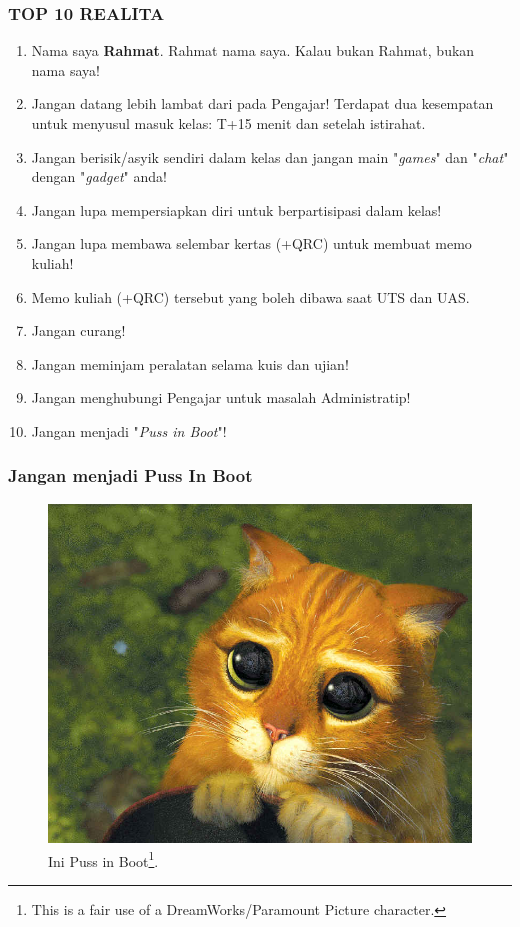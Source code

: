\documentclass[xcolor=table, notheorems, hyperref={pdfpagelabels=false}]{beamer}
\begin{document}
\begin{frame}
\frametitle{TOP 10 REALITA}
\begin{enumerate}
\item Nama saya \textbf{Rahmat}. Rahmat nama saya.
      Kalau bukan Rahmat, bukan nama saya!
\item Jangan datang lebih lambat dari pada Pengajar!
      Terdapat dua kesempatan untuk menyusul masuk kelas: T+15 menit dan setelah istirahat.
\item Jangan berisik/asyik sendiri dalam kelas dan jangan main 
      "\textit{games}" dan "\textit{chat}" dengan "\textit{gadget}" anda!
\item Jangan lupa mempersiapkan diri untuk berpartisipasi dalam kelas!
\item Jangan lupa membawa selembar kertas (+QRC) untuk membuat memo kuliah!
\item Memo kuliah (+QRC) tersebut yang boleh dibawa saat UTS dan UAS.
\item Jangan curang!
\item Jangan meminjam peralatan selama kuis dan ujian!
\item Jangan menghubungi Pengajar untuk masalah Administratip!
\item Jangan menjadi "\textit{Puss in Boot}"!
\end{enumerate}
\end{frame}

\begin{frame}
\frametitle{Jangan menjadi Puss In Boot}
\begin{figure}
\includegraphics[width=0.65\linewidth]{os00-pib}
\caption{Ini Puss in Boot\footnote{
   This is a fair use of a DreamWorks/Paramount Picture character.}.}
\end{figure}
\end{frame}
\end{document}
